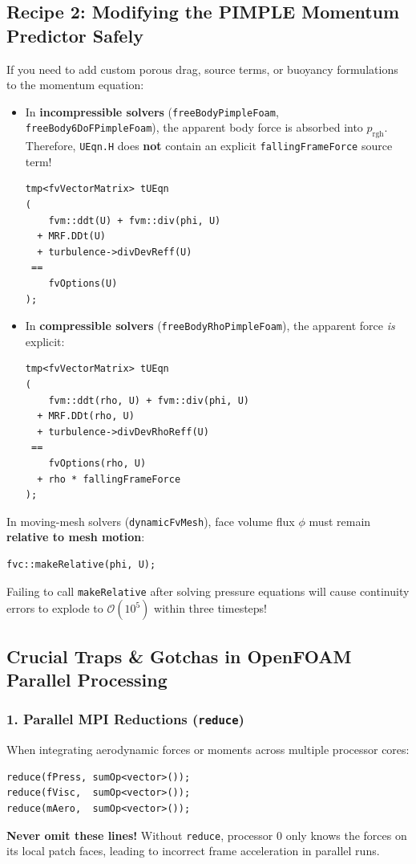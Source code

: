 \documentclass[11pt,a4paper]{article}
\newcommand{\prgh}{p_{\mathrm{rgh}}}
\begin{document}
\subsection{Recipe 2: Modifying the PIMPLE Momentum Predictor Safely}
If you need to add custom porous drag, source terms, or buoyancy formulations to the momentum equation:
\begin{itemize}
    \item In \textbf{incompressible solvers} (\texttt{freeBodyPimpleFoam}, \texttt{freeBody6DoFPimpleFoam}), the apparent body force is absorbed into $\prgh$. Therefore, \texttt{UEqn.H} does \textbf{not} contain an explicit \texttt{fallingFrameForce} source term!
\begin{lstlisting}
tmp<fvVectorMatrix> tUEqn
(
    fvm::ddt(U) + fvm::div(phi, U)
  + MRF.DDt(U)
  + turbulence->divDevReff(U)
 ==
    fvOptions(U)
);
\end{lstlisting}
    \item In \textbf{compressible solvers} (\texttt{freeBodyRhoPimpleFoam}), the apparent force \emph{is} explicit:
\begin{lstlisting}
tmp<fvVectorMatrix> tUEqn
(
    fvm::ddt(rho, U) + fvm::div(phi, U)
  + MRF.DDt(rho, U)
  + turbulence->divDevRhoReff(U)
 ==
    fvOptions(rho, U)
  + rho * fallingFrameForce
);
\end{lstlisting}
\end{itemize}

\begin{warningbox}
In moving-mesh solvers (\texttt{dynamicFvMesh}), face volume flux $\phi$ must remain \textbf{relative to mesh motion}:
\begin{lstlisting}
fvc::makeRelative(phi, U);
\end{lstlisting}
Failing to call \texttt{makeRelative} after solving pressure equations will cause continuity errors to explode to $\mathcal{O}(10^5)$ within three timesteps!
\end{warningbox}

\subsection{Crucial Traps \& Gotchas in OpenFOAM Parallel Processing}

\subsubsection{1. Parallel MPI Reductions (\texttt{reduce})}
When integrating aerodynamic forces or moments across multiple processor cores:
\begin{lstlisting}
reduce(fPress, sumOp<vector>());
reduce(fVisc,  sumOp<vector>());
reduce(mAero,  sumOp<vector>());
\end{lstlisting}
\textbf{Never omit these lines!} Without \texttt{reduce}, processor 0 only knows the forces on its local patch faces, leading to incorrect frame acceleration in parallel runs.
\end{document}
